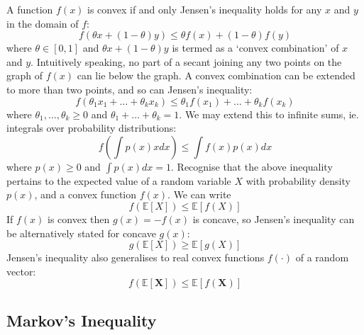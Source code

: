 \documentclass[11pt]{report} %
\begin{document}
A function $f\left(x\right)$ is convex if and only Jensen's inequality holds for any $x$ and $y$ in the domain of $f$:
\begin{equation}
f\left(\theta x + \left(1 - \theta\right)y\right) \leq \theta f\left(x\right) + \left(1 - \theta\right)f\left(y\right)
\end{equation}
where $\theta \in \left[0, 1\right]$ and $\theta x + \left(1 - \theta\right)y$ is termed as a `convex combination' of $x$ and $y$. Intuitively speaking, no part of a secant joining any two points on the graph of $f\left(x\right)$ can lie below the graph. A convex combination can be extended to more than two points, and so can Jensen's inequality:
\begin{equation}
f\left(\theta_{1}x_{1} + \dots + \theta_{k}x_{k}\right) \leq \theta_{1}f\left(x_{1}\right) + \dots + \theta_{k}f\left(x_{k}\right)
\end{equation}
where $\theta_{1}, \dots, \theta_{k} \geq 0$ and $\theta_{1} + \dots + \theta_{k} = 1$. We may extend this to infinite sums, ie. integrals over probability distributions:
\begin{equation}
f\left(\int p\left(x\right) x dx\right) \leq \int f\left(x\right)p\left(x\right) dx
\end{equation}
where $p\left(x\right) \geq 0$ and $\int p\left(x\right) dx = 1$. Recognise that the above inequality pertains to the expected value of a random variable $X$ with probability density $p\left(x\right)$, and a convex function $f\left(x\right)$. We can write
\begin{equation}
f\left(\mathbb{E}\left[X\right]\right) \leq \mathbb{E}\left[f\left(X\right)\right]
\end{equation}
If $f\left(x\right)$ is convex then $g\left(x\right) = -f\left(x\right)$ is concave, so Jensen's inequality can be alternatively stated for concave $g\left(x\right)$:
\begin{equation}
g\left(\mathbb{E}\left[X\right]\right) \geq \mathbb{E}\left[g\left(X\right)\right]
\end{equation}
Jensen's inequality also generalises to real convex functions $f\left(\cdot\right)$ of a random vector:
\begin{equation}
f\left(\mathbb{E}\left[\mathbf{X}\right]\right) \leq \mathbb{E}\left[f\left(\mathbf{X}\right)\right]
\end{equation}

\subsection{Markov's Inequality}
\end{document}
